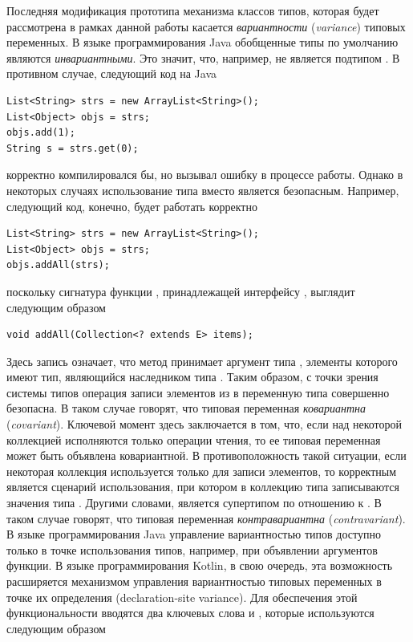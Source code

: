 Последняя модификация прототипа механизма классов типов, которая будет рассмотрена в рамках данной работы касается \emph{вариантности} (\emph{variance}) типовых переменных. В языке программирования Java обобщенные типы по умолчанию являются \emph{инвариантными}. Это значит, что, например,  не является подтипом . В противном случае, следующий код на Java 
\begin{lstlisting}[style=wo_caption]
List<String> strs = new ArrayList<String>();
List<Object> objs = strs;
objs.add(1);
String s = strs.get(0);
\end{lstlisting}
корректно компилировался бы, но вызывал ошибку в процессе работы. Однако в некоторых случаях использование типа  вместо  является безопасным. Например, следующий код, конечно, будет работать корректно
\begin{lstlisting}[style=wo_caption]
List<String> strs = new ArrayList<String>();
List<Object> objs = strs;
objs.addAll(strs);
\end{lstlisting}
поскольку сигнатура функции , принадлежащей интерфейсу , выглядит следующим образом
\begin{lstlisting}[style=wo_caption]
void addAll(Collection<? extends E> items);
\end{lstlisting}
Здесь запись  означает, что метод принимает аргумент типа , элементы которого имеют тип, являющийся наследником типа . Таким образом, с точки зрения системы типов операция записи элементов из  в переменную типа  совершенно безопасна. В таком случае говорят, что типовая переменная  \emph{ковариантна} (\emph{covariant}). Ключевой момент здесь заключается в том, что, если над некоторой коллекцией исполняются только операции чтения, то ее типовая переменная может быть объявлена ковариантной. В противоположность такой ситуации, если некоторая коллекция используется только для записи элементов, то корректным является сценарий использования, при котором в коллекцию типа  записываются значения типа . Другими словами,  является супертипом по отношению к . В таком случае говорят, что типовая переменная \emph{контравариантна} (\emph{contravariant}). В языке программирования Java управление вариантностью типов доступно только в точке использования типов, например, при объявлении аргументов функции. В языке программирования Kotlin, в свою очередь, эта возможность расширяется механизмом управления вариантностью типовых переменных в точке их определения (declaration-site variance). Для обеспечения этой функциональности вводятся два ключевых слова  и , которые используются следующим образом

